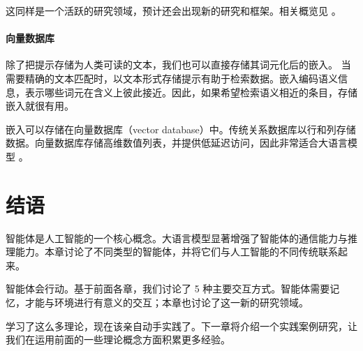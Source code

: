 这同样是一个活跃的研究领域，预计还会出现新的研究和框架。相关概览见 \citet{zhou2026we}。


\paragraph{向量数据库}
除了把提示存储为人类可读的文本，我们也可以直接存储其词元化后的嵌入。
当需要精确的文本匹配时，以文本形式存储提示有助于检索数据。嵌入编码语义信息，表示哪些词元在含义上彼此接近。因此，如果希望检索语义相近的条目，存储嵌入就很有用。

嵌入可以存储在向量数据库（vector database）中。传统关系数据库以行和列存储数据。向量数据库存储高维数值列表，并提供低延迟访问，因此非常适合大语言模型 \citep{xie2023brief,ma2023comprehensive}。



\section{结语}
智能体是人工智能的一个核心概念。大语言模型显著增强了智能体的通信能力与推理能力。本章讨论了不同类型的智能体，并将它们与人工智能的不同传统联系起来。

智能体会行动。基于前面各章，我们讨论了 5 种主要交互方式。智能体需要记忆，才能与环境进行有意义的交互；本章也讨论了这一新的研究领域。

学习了这么多理论，现在该亲自动手实践了。下一章将介绍一个实践案例研究，让我们在运用前面的一些理论概念方面积累更多经验。






